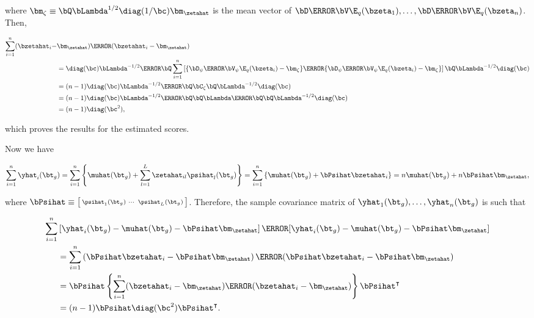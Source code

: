 \documentclass[12pt]{article}
\theoremstyle{plain}
\theoremstyle{definition}
\theoremstyle{remark}
\begin{document}
\noindent where $\bm_\zeta \equiv \bQ \bLambda^{1/2} \diag (1/\bc) \bm_\zetahat$ is the mean vector of
$\bD \T{\bV} \E_q (\bzeta_1), \dots, \bD \T{\bV} \E_q (\bzeta_n)$.
Then,

\begin{align*}
	\sum_{i=1}^n (\bzetahat_i - &\bm_\zetahat) \T{(\bzetahat_i - \bm_\zetahat)} \\
		&= \diag (\bc) \bLambda^{-1/2} \T{\bQ}
			\sum_{i=1}^n \left[
				\{ \bD_\psi \T{\bV_\psi} \E_q (\bzeta_i) - \bm_\zeta \}
					\T{\{ \bD_\psi \T{\bV_\psi} \E_q (\bzeta_i) - \bm_\zeta \}}
			\right]
			\bQ \bLambda^{-1/2} \diag (\bc) \\
		&= (n - 1) \diag (\bc) \bLambda^{-1/2} \T{\bQ} \bC_\zeta \bQ \bLambda^{-1/2} \diag (\bc) \\
		&= (n - 1) \diag (\bc) \bLambda^{-1/2} \T{\bQ} \bQ \bLambda \T{\bQ} \bQ \bLambda^{-1/2} \diag (\bc) \\
		&= (n - 1) \diag (\bc^2),
\end{align*}

\noindent which proves the results for the estimated scores.

Now we have

\[
	\sum_{i=1}^n \yhat_i (\bt_g)
		= \sum_{i=1}^n \left\{ \muhat (\bt_g) + \sum_{l=1}^L \zetahat_{il} \psihat_l (\bt_g) \right\}
		= \sum_{i=1}^n \left\{ \muhat (\bt_g) + \bPsihat \bzetahat_i \right\}
		= n \muhat (\bt_g) + n \bPsihat \bm_\zetahat,
\]

\noindent where $\bPsihat \equiv \bigl[ \begin{smallmatrix} \psihat_1 (\bt_g) & \cdots & \psihat_L (\bt_g)
\end{smallmatrix} \bigr]$.
Therefore, the sample covariance matrix of $\yhat_1 (\bt_g), \dots, \yhat_n (\bt_g)$ is such that

\begin{align*}
	\sum_{i=1}^n 
		&\left[ \yhat_i (\bt_g) - \muhat (\bt_g) - \bPsihat \bm_\zetahat \right]
			\T{\left[ \yhat_i (\bt_g) - \muhat (\bt_g) - \bPsihat \bm_\zetahat \right]} \\
		&= \sum_{i=1}^n \left( \bPsihat \bzetahat_i - \bPsihat \bm_\zetahat \right)
			\T{\left( \bPsihat \bzetahat_i - \bPsihat \bm_\zetahat \right)} \\
		&= \bPsihat \left\{ \sum_{i=1}^n (\bzetahat_i - \bm_\zetahat) \T{(\bzetahat_i - \bm_\zetahat)} \right\} \bPsihat^{\intercal} \\
		&= (n - 1) \bPsihat \diag (\bc^2) \bPsihat^{\intercal}.
\end{align*}
\end{document}
